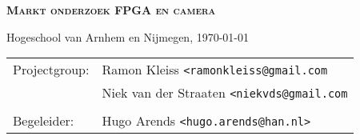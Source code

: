 \begin{titlepage}

\Huge \textsc{\bfseries Markt onderzoek FPGA en
\newline camera} \normalsize

\vfill

\begin{minipage}[b][1em][b]{\linewidth}
\end{minipage}

\begin{minipage}[b][1em][b]{\linewidth}
    Hogeschool van Arnhem en Nijmegen, \today
\end{minipage}

\begin{minipage}[b][2em][b]{\linewidth}
\end{minipage}

\begin{minipage}[b][2em][b]{\linewidth}
\end{minipage}

\begin{minipage}[b][4em][b]{\linewidth}
    \begin{tabular}{l l }
        Projectgroup:   & Ramon Kleiss \texttt{<ramonkleiss@gmail.com} \\
                        & Niek van der Straaten \texttt{<niekvds@gmail.com} \\
                        \\
        Begeleider:     & Hugo Arends \texttt{<hugo.arends@han.nl>} \\
    \end{tabular}
\end{minipage}

\end{titlepage}
